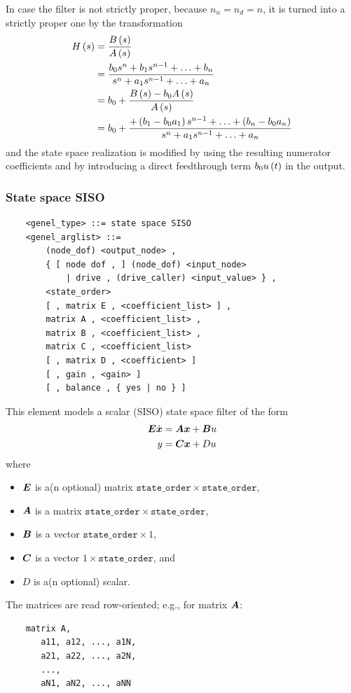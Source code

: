 In case the filter is not strictly proper, because $n_n=n_d=n$,
it is turned into a strictly proper one by the transformation
\begin{align*}
	H\left( s \right)
	&= \frac{B\left( s \right)}{A\left( s \right)} \\
	&= \frac{
		b_0 s^n
		+ b_1 s^{n-1}
		+ \ldots
		+ b_n
	}{
		s^n
		+ a_1 s^{n-1}
		+ \ldots
		+ a_n
	} \\
	&= b_0 + \frac{B\left( s \right) - b_0 A\left( s \right)}{A\left( s \right)} \\
	&= b_0 + \frac{
		+ \left( b_1 - b_0 a_1 \right) s^{n-1}
		+ \ldots
		+ \left( b_n - b_0 a_n \right)
	}{
		s^n
		+ a_1 s^{n-1}
		+ \ldots
		+ a_n
	}
\end{align*}
and the state space realization is modified by using the resulting 
numerator coefficients and by introducing a direct feedthrough term
$b_0 u\left( t \right)$ in the output.



\subsubsection{State space SISO}
\begin{verbatim}
    <genel_type> ::= state space SISO
    <genel_arglist> ::=
        (node_dof) <output_node> ,
        { [ node dof , ] (node_dof) <input_node>
            | drive , (drive_caller) <input_value> } ,
        <state_order>
        [ , matrix E , <coefficient_list> ] ,
        matrix A , <coefficient_list> ,
        matrix B , <coefficient_list> ,
        matrix C , <coefficient_list>
        [ , matrix D , <coefficient> ]
        [ , gain , <gain> ]
        [ , balance , { yes | no } ]
\end{verbatim}
This element models a scalar (SISO) state space filter of the form
\begin{align*}
	\boldsymbol{E} \dot{\boldsymbol{x}} &= \boldsymbol{A} \boldsymbol{x} + \boldsymbol{B} u \\
	y &= \boldsymbol{C} \boldsymbol{x} + D u
\end{align*}
where
\begin{itemize}
\item $\boldsymbol{E}$ is a(n optional) matrix
	$\mathtt{state\_order} \times \mathtt{state\_order}$,
\item $\boldsymbol{A}$ is a matrix
	$\mathtt{state\_order} \times \mathtt{state\_order}$,
\item $\boldsymbol{B}$ is a vector
	$\mathtt{state\_order} \times 1$,
\item $\boldsymbol{C}$ is a vector
	$1 \times \mathtt{state\_order}$, and
\item $D$ is a(n optional) scalar.
\end{itemize}
The matrices are read row-oriented; e.g., for matrix $\boldsymbol{A}$:
\begin{verbatim}
    matrix A,
       a11, a12, ..., a1N,
       a21, a22, ..., a2N,
       ...,
       aN1, aN2, ..., aNN
\end{verbatim}

